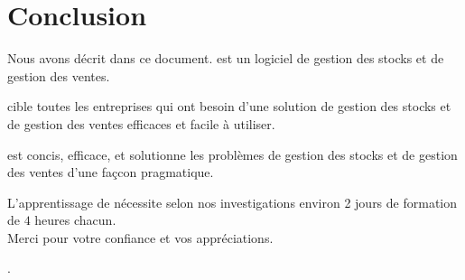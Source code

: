 \chapter{Conclusion}\label{chap:conclusion}

Nous avons d\'ecrit \yeren dans ce document. 
\yeren est un logiciel de gestion des stocks
et de gestion des ventes.

\yeren cible toutes les entreprises qui ont besoin
d'une solution de gestion des stocks et de gestion
des ventes efficaces et facile \`a utiliser.

\yeren est concis, efficace, et solutionne
les probl\`emes de gestion des stocks et
de gestion des ventes d'une fa\c{c}con
pragmatique.

L'apprentissage de \yeren n\'ecessite selon nos 
investigations environ 2 jours de formation
de $4$ heures chacun.\\

Merci pour votre confiance et vos appr\'eciations.

\textbf{\emph{\myfullacademicname}}.